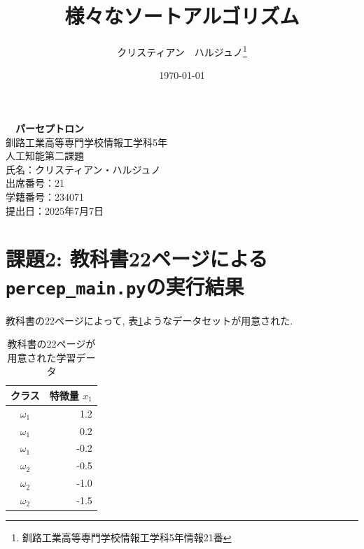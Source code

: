 \documentclass[a4j, 12pt]{jarticle}
\title{様々なソートアルゴリズム}
\author{クリスティアン　ハルジュノ\thanks{釧路工業高等専門学校情報工学科5年情報21番}}
\date{\today}
\begin{document}
\begin{titlepage}
  \centering
  \vspace*{3cm}

  {\fontsize{25pt}{36pt}\selectfont\bfseries　パーセプトロン} \\[1cm]  %
  {\Large 釧路工業高等専門学校情報工学科5年} \\[1cm]
  {\Large 人工知能第二課題} \\[1cm]
  {\large 氏名：クリスティアン・ハルジュノ} \\[1cm]
  {\large 出席番号：21} \\[1cm]
  {\large 学籍番号：234071} \\[5cm]

  {\Large 提出日：2025年7月7日} \\

  \vfill

\end{titlepage}
\tableofcontents
\newpage
\setcounter{page}{1}
\section{課題2: 教科書22ページによる\texttt{percep\_main.py}の実行結果}
教科書の22ページによって, 表\ref{page22datasetbefore}ようなデータセットが用意された. 
\begin{table}[H]
  \centering
  \caption{教科書の22ページが用意された学習データ}\label{page22datasetbefore}
  \begin{tabular}{c r}
    \hline
    クラス & 特徴量 $x_1$ \\
    \hline
    $\omega_1$ &  1.2 \\
    $\omega_1$ &  0.2 \\
    $\omega_1$ & -0.2 \\
    $\omega_2$ & -0.5 \\
    $\omega_2$ & -1.0 \\
    $\omega_2$ & -1.5 \\
    \hline
  \end{tabular}
\end{table}
\end{document}
